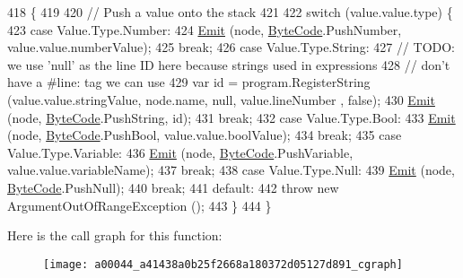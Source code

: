 \begin{DoxyCode}
418                                                              \{
419 
420             \textcolor{comment}{// Push a value onto the stack}
421 
422             \textcolor{keywordflow}{switch} (value.value.type) \{
423             \textcolor{keywordflow}{case} Value.Type.Number:
424                 \hyperlink{a00044_a774e8c143cdda0584fcfdda98626a83c}{Emit} (node, \hyperlink{a00041_ad5dfb6ee68ca7469623ad3e459f98894}{ByteCode}.PushNumber, value.value.numberValue);
425                 \textcolor{keywordflow}{break};
426             \textcolor{keywordflow}{case} Value.Type.String:
427                 \textcolor{comment}{// TODO: we use 'null' as the line ID here because strings used in expressions}
428                 \textcolor{comment}{// don't have a #line: tag we can use}
429                 var \textcolor{keywordtype}{id} = program.RegisterString (value.value.stringValue, node.name, null, value.lineNumber
      , \textcolor{keyword}{false});
430                 \hyperlink{a00044_a774e8c143cdda0584fcfdda98626a83c}{Emit} (node, \hyperlink{a00041_ad5dfb6ee68ca7469623ad3e459f98894}{ByteCode}.PushString, \textcolor{keywordtype}{id});
431                 \textcolor{keywordflow}{break};
432             \textcolor{keywordflow}{case} Value.Type.Bool:
433                 \hyperlink{a00044_a774e8c143cdda0584fcfdda98626a83c}{Emit} (node, \hyperlink{a00041_ad5dfb6ee68ca7469623ad3e459f98894}{ByteCode}.PushBool, value.value.boolValue);
434                 \textcolor{keywordflow}{break};
435             \textcolor{keywordflow}{case} Value.Type.Variable:
436                 \hyperlink{a00044_a774e8c143cdda0584fcfdda98626a83c}{Emit} (node, \hyperlink{a00041_ad5dfb6ee68ca7469623ad3e459f98894}{ByteCode}.PushVariable, value.value.variableName);
437                 \textcolor{keywordflow}{break};
438             \textcolor{keywordflow}{case} Value.Type.Null:
439                 \hyperlink{a00044_a774e8c143cdda0584fcfdda98626a83c}{Emit} (node, \hyperlink{a00041_ad5dfb6ee68ca7469623ad3e459f98894}{ByteCode}.PushNull);
440                 \textcolor{keywordflow}{break};
441             \textcolor{keywordflow}{default}:
442                 \textcolor{keywordflow}{throw} \textcolor{keyword}{new} ArgumentOutOfRangeException ();
443             \}
444         \}
\end{DoxyCode}


Here is the call graph for this function\-:
\nopagebreak
\begin{figure}[H]
\begin{center}
\leavevmode
\texttt{[image: a00044\_a41438a0b25f2668a180372d05127d891\_cgraph]}
\end{center}
\end{figure}


